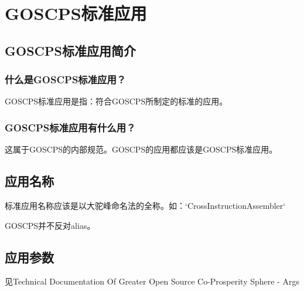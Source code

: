 \chapter{GOSCPS标准应用}

\section{GOSCPS标准应用简介}
\subsection{什么是GOSCPS标准应用？}
GOSCPS标准应用是指：符合GOSCPS所制定的标准的应用。

\subsection{GOSCPS标准应用有什么用？}
这属于GOSCPS的内部规范。GOSCPS的应用都应该是GOSCPS标准应用。


\section{应用名称}
标准应用名称应该是以大驼峰命名法的全称。如：`CrossInstructionAssembler`\newline{}

GOSCPS并不反对alias。

\section{应用参数}

见Technical Documentation Of Greater Open Source Co-Prosperity Sphere - Args

